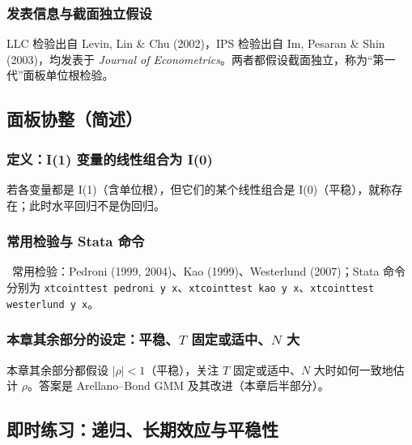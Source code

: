\subsubsection{发表信息与截面独立假设}

LLC 检验出自 Levin, Lin \& Chu (2002)，IPS 检验出自 Im, Pesaran \& Shin (2003)，均发表于 \emph{Journal of Econometrics}。两者都假设截面独立，称为“第一代”面板单位根检验。

\subsection{面板协整（简述）}

\subsubsection{定义：I(1) 变量的线性组合为 I(0)}

若各变量都是 I(1)（含单位根），但它们的某个线性组合是 I(0)（平稳），就称存在；此时水平回归不是伪回归。

\subsubsection{常用检验与 Stata 命令}

\tagext\ 常用检验：Pedroni (1999, 2004)、Kao (1999)、Westerlund (2007)；Stata 命令分别为 \texttt{xtcointtest pedroni y x}、\texttt{xtcointtest kao y x}、\texttt{xtcointtest westerlund y x}。

\subsubsection{本章其余部分的设定：平稳、\texorpdfstring{$T$}{T} 固定或适中、\texorpdfstring{$N$}{N} 大}

本章其余部分都假设 $|\rho|<1$（平稳），关注 $T$ 固定或适中、$N$ 大时如何一致地估计 $\rho$。答案是 Arellano–Bond GMM 及其改进（本章后半部分）。


\subsection{即时练习：递归、长期效应与平稳性}

